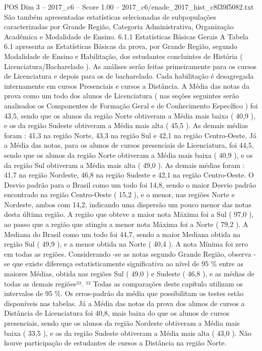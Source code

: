 \begin{textsample}{POS Dim 3 – 2017\_c6 – Score 1.00 – 2017\_c6/enade\_2017\_hist\_c8f39f5082.txt}
São também apresentadas estatísticas selecionadas de subpopulações caracterizadas por Grande Região, Categoria Administrativa, Organização Acadêmica e Modalidade de Ensino. 6.1.1 Estatísticas Básicas Gerais A Tabela 6.1 apresenta as Estatísticas Básicas da prova, por Grande Região, segundo Modalidade de Ensino e Habilitação, dos estudantes concluintes de História ( Licenciatura/Bacharelado ).
As análises serão feitas primeiramente para os cursos de Licenciatura e depois para os de bacharelado.
Cada habilitação é desagregada internamente em cursos Presenciais e cursos a Distância.
A Média das notas da prova como um todo dos alunos de Licenciatura ( nas seções seguintes serão analisados os Componentes de Formação Geral e de Conhecimento Específico ) foi 43,5, sendo que os alunos da região Norte obtiveram a Média mais baixa ( 40,9 ), e os da região Sudeste obtiveram a Média mais alta ( 45,5 ).
As demais médias foram : 41,3 na região Norte, 43,3 na região Sul e 42,1 na região Centro-Oeste.
Já a Média das notas, para os alunos de cursos presenciais de Licenciatura, foi 44,5, sendo que os alunos da região Norte obtiveram a Média mais baixa ( 40,9 ), e os da região Sul obtiveram a Média mais alta ( 49,0 ).
As demais médias foram : 41,7 na região Nordeste, 46,8 na região Sudeste e 42,1 na região Centro-Oeste.
O Desvio padrão para o Brasil como um todo foi 14,8, sendo o maior Desvio padrão encontrado na região Centro-Oeste ( 15,2 ), e o menor, nas regiões Norte e Nordeste, ambos com 14,2, indicando uma dispersão um pouco menor das notas desta última região.
A região que obteve a maior nota Máxima foi a Sul ( 97,0 ), ao passo que a região que atingiu a menor nota Máxima foi a Norte ( 79,2 ).
A Mediana do Brasil como um todo foi 44,7, sendo a maior Mediana obtida na região Sul ( 49,9 ), e a menor obtida na Norte ( 40,4 ).
A nota Mínima foi zero em todas as regiões.
Considerando -se as notas segundo Grande Região, observa -se que existe diferença estatisticamente significativa ao nível de 95 \% entre as maiores Médias, obtida nas regiões Sul ( 49,0 ) e Sudeste ( 46,8 ), e as médias de todas as demais regiões²². ²² Todas as comparações deste capítulo utilizam os intervalos de 95 \%.
Os erros-padrão da média que possibilitam os testes estão disponíveis nas tabelas.
Já a Média das notas da prova dos alunos de cursos a Distância de Licenciatura foi 40,8, mais baixa do que os alunos de cursos presenciais, sendo que os alunos da região Nordeste obtiveram a Média mais baixa ( 33,5 ), e os da região Sudeste obtiveram a Média mais alta ( 43,0 ).
Não houve participação de estudantes de cursos a Distância na região Norte.

\end{textsample}
